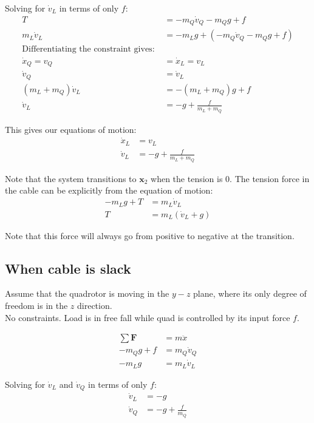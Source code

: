 \documentclass[11pt]{article}
\begin{document}
Solving for $\dot{v}_L$ in terms of only $f$:
\begin{align*}
T &= - m_Q \dot{v}_Q - m_Q g + f \\
m_L \dot{v}_L &= -m_L g +(- m_Q \dot{v}_Q - m_Q g + f ) \\
\text{Differentiating the constraint gives: } & \\
\dot{x}_Q = v_Q &= \dot{x}_L = v_L \\
\dot{v}_Q &= \dot{v}_L \\
(m_L+m_Q) \dot{v}_L &= -(m_L+m_Q) g + f \\
\dot{v}_L &= -g +\frac{f}{m_L+m_Q}
\end{align*} 

This gives our equations of motion: 
\begin{align*}
\dot{x}_L &= v_L \\
\dot{v}_L &= -g +\frac{f}{m_L+m_Q}
\end{align*} 

Note that the system transitions to $\mathbf{x}_2$ when the tension is 0. The tension force in the cable can be explicitly from the equation of motion:
\begin{align*}
-m_L g + T &= m_L \dot{v}_L \\
T &= m_L (\dot{v}_L + g)
\end{align*}

Note that this force will always go from positive to negative at the transition. 







\newpage
\subsection{When cable is slack}

Assume that the quadrotor is moving in the $y-z$ plane, where its only degree of freedom is in the $z$ direction.  \\
No constraints. Load is in free fall while quad is controlled by its input force $f$. 

\mbox{} \newline
\begin{align*}
\sum \mathbf{F} &= m \ddot{x} \\
-m_Q g + f &= m_Q \dot{v}_Q \\
-m_L g &= m_L \dot{v}_L
\end{align*}

Solving for $\dot{v}_L$ and $\dot{v}_Q$ in terms of only $f$:
\begin{align*}
\dot{v}_L &= -g \\
\dot{v}_Q &= -g + \frac{f}{m_Q} \\
\end{align*} 
\end{document}
